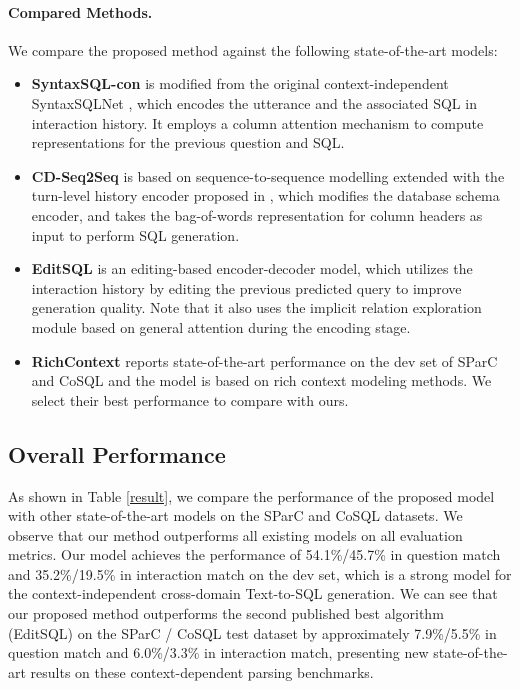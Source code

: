\documentclass[letterpaper]{article} \usepackage{aaai21}  \usepackage{times}  \usepackage{helvet} \usepackage{courier}  \usepackage[hyphens]{url}  \usepackage{graphicx} \urlstyle{rm} \def\UrlFont{\rm}  \usepackage{natbib}  \usepackage{caption} \frenchspacing  \setlength{\pdfpagewidth}{8.5in}  \setlength{\pdfpageheight}{11in}
\begin{document}
\paragraph{Compared Methods.}
We compare the proposed method against the following state-of-the-art models:
\begin{itemize}
    \item \textbf{SyntaxSQL-con} is modified from the original context-independent SyntaxSQLNet \cite{DBLP:conf/emnlp/YuYYZWLR18}, which encodes the utterance and the associated SQL in interaction history. It employs a column attention mechanism to compute representations for the previous question and SQL.
    \item \textbf{CD-Seq2Seq} \cite{DBLP:conf/acl/YuZYTLLELPCJDPS19} is based on sequence-to-sequence modelling extended with the turn-level history encoder proposed in \cite{DBLP:conf/naacl/SuhrIA18}, which modifies the database schema encoder, and takes the bag-of-words representation for column headers as input to perform SQL generation.
    \item \textbf{EditSQL} \cite{DBLP:conf/emnlp/ZhangYESXLSXSR19} is an editing-based encoder-decoder model, which utilizes the interaction history by editing the previous predicted query to improve generation quality. 
    Note that it also uses the implicit relation exploration module based on general attention during the encoding stage.
    \item \textbf{RichContext} \cite{DBLP:conf/ijcai/LiuCGLZZ20} reports state-of-the-art performance on the dev set of SParC and CoSQL and the model is based on rich context modeling methods. We select their best performance to compare with ours. 
\end{itemize}



\subsection{Overall Performance}
As shown in Table \ref{result}, we compare the performance of the proposed model with other state-of-the-art models on the SParC and CoSQL datasets. 
We observe that our method outperforms all existing models on all evaluation metrics. 
Our model achieves the performance of 54.1\%/45.7\% in question match and 35.2\%/19.5\% in interaction match on the dev set, which is a strong model for the context-independent cross-domain Text-to-SQL generation.
We can see that our proposed method outperforms the second published best algorithm (EditSQL) on the SParC / CoSQL test dataset by approximately 7.9\%/5.5\% in question match and 6.0\%/3.3\% in interaction match, presenting new state-of-the-art results on these context-dependent parsing benchmarks. 
\end{document}
